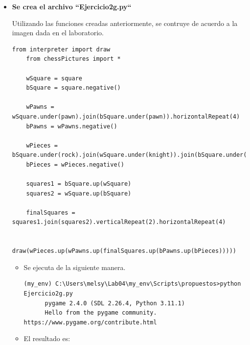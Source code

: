 \documentclass{article}
\begin{document}
\begin{itemize}
  \pagebreak

  \item \textbf{Se crea el archivo ``Ejercicio2g.py``}
  
  \vspace{\baselineskip}
  
  Utilizando las funciones creadas anteriormente, se contruye de acuerdo a la imagen dada en el laboratorio.

    \begin{lstlisting}[style=python]
    from interpreter import draw
    from chessPictures import *

    wSquare = square
    bSquare = square.negative()

    wPawns = wSquare.under(pawn).join(bSquare.under(pawn)).horizontalRepeat(4)
    bPawns = wPawns.negative()

    wPieces = bSquare.under(rock).join(wSquare.under(knight)).join(bSquare.under(bishop)).join(wSquare.under(queen)).join(bSquare.under(king)).join(wSquare.under(bishop)).join(bSquare.under(knight)).join(wSquare.under(rock))
    bPieces = wPieces.negative()

    squares1 = bSquare.up(wSquare)
    squares2 = wSquare.up(bSquare)

    finalSquares = squares1.join(squares2).verticalRepeat(2).horizontalRepeat(4)

    draw(wPieces.up(wPawns.up(finalSquares.up(bPawns.up(bPieces)))))
    \end{lstlisting}

    \vspace{\baselineskip}

    \begin{itemize}
      \item Se ejecuta de la siguiente manera.

      \begin{lstlisting}[style=shell]
      (my_env) C:\Users\melsy\Lab04\my_env\Scripts\propuestos>python Ejercicio2g.py
      pygame 2.4.0 (SDL 2.26.4, Python 3.11.1)
      Hello from the pygame community. https://www.pygame.org/contribute.html
      \end{lstlisting}

      \vspace{\baselineskip}

      \item El resultado es:
      
      \vspace{\baselineskip}


\end{itemize}
\end{itemize}
\end{document}
